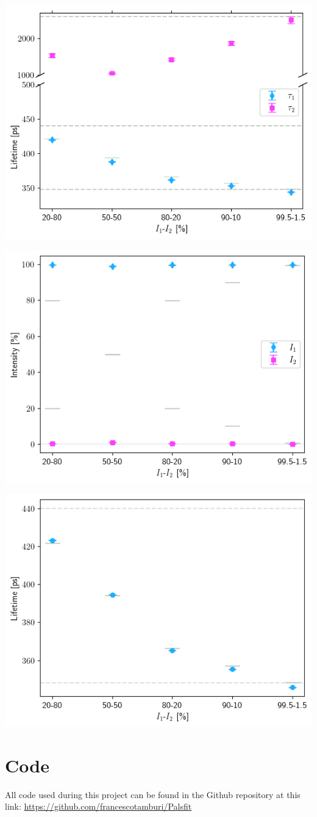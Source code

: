 \begin{minipage}{.47\linewidth}
     
    \includegraphics[width=\linewidth]{Batch 7/348-440/output/2 life/lifetimes.png}
    \label{fig:348-440-2life}
\end{minipage}
\hfill
\begin{minipage}{.47\linewidth}
     
    \includegraphics[width=\linewidth]{Batch 7/348-440/output/2 life/intensities.png}
    \label{fig:348-440-2lifeint}
\end{minipage}
\begin{minipage}{\linewidth}
     
    \includegraphics[width= .47\linewidth]{Batch 7/348-440/output/1 life/lifetime.png}
    \label{fig:348-440-1life}
\end{minipage}
\pagebreak
\chapter{Code}
All code used during this project can be found in the Github repository at this link:
\url{https://github.com/francescotamburi/Palsfit}
